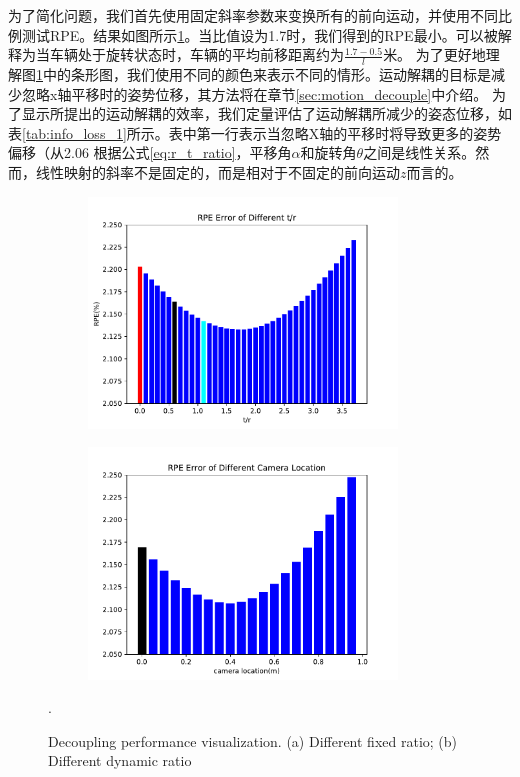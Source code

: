 为了简化问题，我们首先使用固定斜率参数来变换所有的前向运动，并使用不同比例测试RPE。结果如图所示\ref{fig:static_decouple}。当比值设为1.7时，我们得到的RPE最小。可以被解释为当车辆处于旋转状态时，车辆的平均前移距离约为$\frac{1.7-0.5}{l}$米。
为了更好地理解{图\ref{fig:static_decouple}中的}条形图，我们{使用}不同的颜色来表示不同的情形。运动解耦的目标是减少忽略x轴平移时的姿势位移，其方法将在章节\ref{sec:motion_decouple}中介绍。
为了显示所提出的运动解耦的效率，我们定量评估了运动解耦所减少的姿态位移，如表\ref{tab:info_loss_1}所示。表中第一行表示当忽略X轴的平移时将导致更多的姿势偏移（从2.06%
根据公式\eqref{eq:r_t_ratio}，平移角$\alpha$和旋转角$\theta$之间是线性关系。然而，线性映射的斜率不是固定的，而是相对于不固定的前向运动$z$而言的。
\begin{figure}[ht]
    \centering
    \begin{subfigure}[b]{0.45\textwidth}
        \centering
        \includegraphics[width=0.9\textwidth]{datavo/r_t_ratio.pdf}
        \caption{}
        \label{fig:static_decouple}
    \end{subfigure}
    \begin{subfigure}[b]{0.45\textwidth}
        \centering
        \includegraphics[width=0.9\textwidth]{datavo/r_t_ratio_2.pdf}
        \caption{}
        \label{fig:dynamic_decouple}
    \end{subfigure}
    \caption{Decoupling performance {visualization}. (a) Different fixed ratio; (b) Different dynamic ratio}.
    \label{fig:r_t_ratio}
\end{figure}


